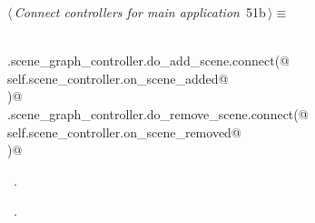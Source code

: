 \documentclass[
    a4paper,      %
    10pt,         %
    openright,    %
    notitlepage,  %
    parskip=half, %
]{scrreprt}       %
\theoremstyle{definition}                    %
\begin{document}
\begin{flushleft} \small
\begin{minipage}{\linewidth}\label{scrap77}\raggedright\small
{} $\langle\,${\itshape Connect controllers for main application}\nobreak\ {\footnotesize {51b}}$\,\rangle\equiv$
\vspace{-1exm}
\begin{list}{}{} \item
\mbox{}\lstinline@@\\
\mbox{}\lstinline@self.scene_graph_controller.do_add_scene.connect(@\\
\mbox{}\lstinline@    self.scene_controller.on_scene_added@\\
\mbox{}\lstinline@)@\\
\mbox{}\lstinline@self.scene_graph_controller.do_remove_scene.connect(@\\
\mbox{}\lstinline@    self.scene_controller.on_scene_removed@\\
\mbox{}\lstinline@)@{\NWsep}
\end{list}
\vspace{-1.5ex}
\footnotesize
\begin{list}{}{\setlength{\itemsep}{-\parsep}\setlength{\itemindent}{-\leftmargin}}
\item \NWtxtMacroDefBy\ .
\item \NWtxtMacroRefIn\ .

\item{}
\end{list}
\end{minipage}\vspace{4ex}
\end{flushleft}
\end{document}
